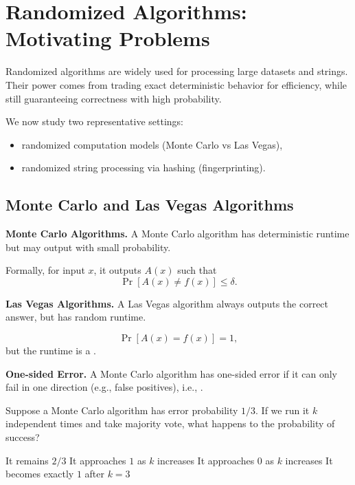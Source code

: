 \documentclass[11pt]{exam}
\begin{document}
	
	
	
	\section{Randomized Algorithms: Motivating Problems}

Randomized algorithms are widely used for processing large datasets and strings. Their power comes from trading exact deterministic behavior for efficiency, while still guaranteeing correctness with high probability.

We now study two representative settings:
\begin{itemize}
    \item randomized computation models (Monte Carlo vs Las Vegas),
    \item randomized string processing via hashing (fingerprinting).
\end{itemize}

\subsection{Monte Carlo and Las Vegas Algorithms}

\vspace{0.5em}

\textbf{Monte Carlo Algorithms.}
A Monte Carlo algorithm has deterministic runtime but may output  with small probability.

Formally, for input $x$, it outputs $A(x)$ such that
\[
\Pr[A(x) \neq f(x)] \le \delta.
\]

\vspace{0.3in}

\textbf{Las Vegas Algorithms.}
A Las Vegas algorithm always outputs the correct answer, but has random runtime.

\[
\Pr[A(x) = f(x)] = 1,
\]
but the runtime is a .

\vspace{0.5in}

\textbf{One-sided Error.}
A Monte Carlo algorithm has one-sided error if it can only fail in one direction (e.g., false positives), i.e., . 

\newpage

\begin{Qu}
Suppose a Monte Carlo algorithm has error probability $1/3$. If we run it $k$ independent times and take majority vote, what happens to the probability of success?

\begin{itemize}
    \aitem It remains $2/3$
    \bitem It approaches $1$ as $k$ increases
    \citem It approaches $0$ as $k$ increases
    \ditem It becomes exactly $1$ after $k = 3$
\end{itemize}
\end{Qu}
\end{document}
